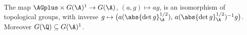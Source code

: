 The map $\AGplus\times G(\A)^1\to G(\A)$, $(a,g)\mapsto ag$, is an isomorphism of topological groups, with inverse
$g\mapsto\bigl(a(\abs{\det g}_\A^{1/2}),\,a(\abs{\det g}_\A^{1/2})^{-1}g\bigr)$. Moreover $G(\Q)\subseteq G(\A)^1$.
